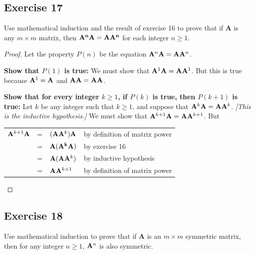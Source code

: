 \documentclass[14pt]{extarticle}
\newcommand{\cy}{\color{cyan}}
\begin{document}
\subsection{Exercise 17}
Use mathematical induction and the result of exercise 16 to prove that if {\bf A} is any \(m \times m\) matrix, then \({\bf A^n A = AA^n}\) for each integer \(n \geq 1\).

\begin{proof}
Let the property \(P(n)\) be the equation \({\bf A}^n {\bf A} = {\bf A}{\bf A}^n\).

{\bf Show that \(P(1)\) is true:} We must show that \({\bf A}^1{\bf A} = {\bf A}{\bf A}^1\). But this is true because 
\({\bf A}^1 = {\bf A}\) and \({\bf A}{\bf A} = {\bf A}{\bf A}\).

{\bf Show that for every integer \(k \geq 1\), if \(P(k)\) is true, then \(P(k + 1)\) is true:} Let \(k\) be any integer 
such that \(k \geq 1\), and suppose that \({\bf A}^k{\bf A} = {\bf A}{\bf A}^k\). {\it [This is the inductive hypothesis.]} 
We must show that \({\bf A}^{k+1}{\bf A} = {\bf A}{\bf A}^{k+1}\). But
\begin{center}
\begin{tabular}{rcll}
\({\bf A}^{k+1}{\bf A}\) & = & \(({\bf A}{\bf A}^k){\bf A}\) & {\cy by definition of matrix power} \\
& = & \({\bf A}({\bf A^k}{\bf A})\) & {\cy by exercise 16} \\
& = & \({\bf A}({\bf A}{\bf A}^k)\) & {\cy by inductive hypothesis} \\
& = & \({\bf A}{\bf A}^{k+1}\) & {\cy by definition of matrix power} \\
\end{tabular}
\end{center}
\end{proof}

\subsection{Exercise 18}
Use mathematical induction to prove that if {\bf A} is an \(m \times m\) symmetric matrix, then for any integer 
\(n \geq 1\), \({\bf A}^n\) is also symmetric.
\end{document}
